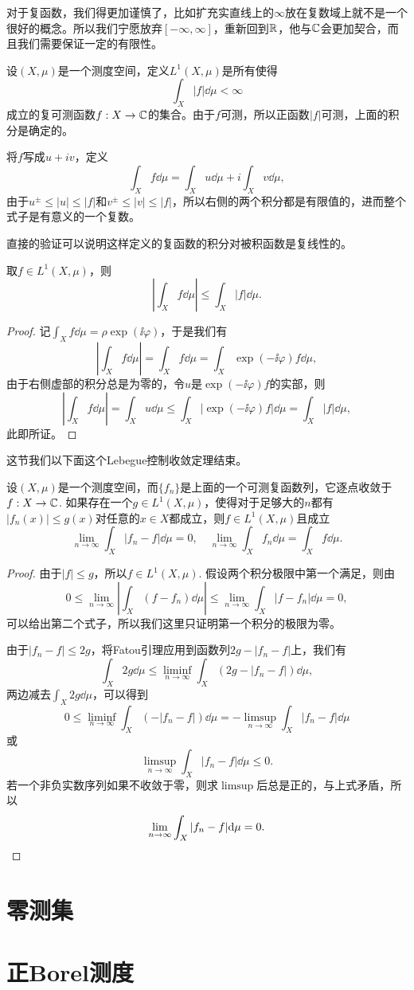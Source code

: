 \begin{para}
对于复函数，我们得更加谨慎了，比如扩充实直线上的$\infty$放在复数域上就不是一个很好的概念。所以我们宁愿放弃$[-\infty,\infty]$，重新回到$\mathbb{R}$，他与$\mathbb{C}$会更加契合，而且我们需要保证一定的有限性。

设$(X,\mu)$是一个测度空间，定义$L^1(X,\mu)$是所有使得
\[
	\int_X |f|\dd \mu <\infty
\]
成立的复可测函数$f:X\to \mathbb{C}$的集合。由于$f$可测，所以正函数$|f|$可测，上面的积分是确定的。

将$f$写成$u+iv$，定义
\[
	\int_X f\dd \mu =\int_X u\dd \mu +i \int_X v\dd \mu,
\]
由于$u^\pm\leq |u| \leq |f|$和$v^\pm\leq |v| \leq |f|$，所以右侧的两个积分都是有限值的，进而整个式子是有意义的一个复数。

直接的验证可以说明这样定义的复函数的积分对被积函数是复线性的。
\end{para}

\begin{pro}
取$f\in L^1(X,\mu)$，则
\[
	\left|\int_X f\dd \mu\right| \leq \int_X |f|\dd \mu.
\]
\end{pro}

\begin{proof}
记$\int_X f\dd \mu=\rho \exp(\ii \varphi)$，于是我们有
\[
	\left|\int_X f\dd \mu\right|=\int_X f\dd \mu=\int_X \exp(-\ii \varphi)f\dd \mu,
\]
由于右侧虚部的积分总是为零的，令$u$是$\exp(-\ii \varphi)f$的实部，则
\[
	\left|\int_X f\dd \mu\right|=\int_X u\dd \mu\leq \int_X |\exp(-\ii \varphi)f|\dd \mu=\int_X |f|\dd \mu,
\]
此即所证。
\end{proof}

这节我们以下面这个Lebegue控制收敛定理结束。

\begin{thm}[Lebegue控制收敛定理]
设$(X,\mu)$是一个测度空间，而$\{f_n\}$是上面的一个可测复函数列，它逐点收敛于$f:X\to \mathbb{C}$. 如果存在一个$g\in L^1(X,\mu)$，使得对于足够大的$n$都有$|f_n(x)|\leq g(x)$对任意的$x\in X$都成立，则$f\in L^1(X,\mu)$且成立
\[
	\lim_{n\to\infty}\int_X |f_n-f|\dd\mu=0,\quad \lim_{n\to\infty}\int_X f_n\dd\mu=\int_X f\dd\mu.
\]
\end{thm}

\begin{proof}
由于$|f|\leq g$，所以$f\in L^1(X,\mu)$. 假设两个积分极限中第一个满足，则由
\[
	0\leq \lim_{n\to \infty} \left| \int_X (f-f_n)\dd \mu\right|\leq\lim_{n\to \infty}\int_X |f-f_n|\dd \mu=0,
\]
可以给出第二个式子，所以我们这里只证明第一个积分的极限为零。

由于$|f_n-f|\leq 2g$，将Fatou引理应用到函数列$2g-|f_n-f|$上，我们有
\[
	\int_X 2g \dd \mu\leq \liminf_{n\to \infty}\int_X \left(2g-|f_n-f|\right) \dd \mu,
\]
两边减去$\int_X 2g \dd \mu$，可以得到
\[
	0\leq \liminf_{n\to \infty}\int_X \left(-|f_n-f|\right) \dd \mu=-\limsup_{n\to \infty}\int_X |f_n-f| \dd \mu
\]
或
\[
	\limsup_{n\to \infty}\int_X |f_n-f| \dd \mu\leq 0.
\]
若一个非负实数序列如果不收敛于零，则求$\limsup$后总是正的，与上式矛盾，所以
\[
	\lim_{n\to \infty}\int_X |f_n-f| \mathrm{d} \mu=0.\qedhere
\]
\end{proof}

\section{零测集}

\section{正Borel测度}